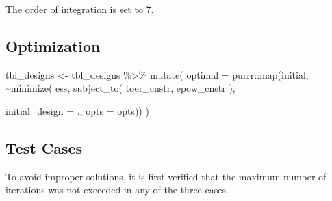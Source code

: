 \documentclass[
]{book}
\newenvironment{Shaded}{\begin{snugshade}}{\end{snugshade}}
\newcommand{\AttributeTok}[1]{\textcolor[rgb]{0.77,0.63,0.00}{#1}}
\newcommand{\FunctionTok}[1]{\textcolor[rgb]{0.00,0.00,0.00}{#1}}
\newcommand{\NormalTok}[1]{#1}
\newcommand{\OtherTok}[1]{\textcolor[rgb]{0.56,0.35,0.01}{#1}}
\newcommand{\SpecialCharTok}[1]{\textcolor[rgb]{0.00,0.00,0.00}{#1}}
\begin{document}
The order of integration is set to 7.

\hypertarget{optimization-16}{%
\subsection{Optimization}\label{optimization-16}}

\begin{Shaded}
\begin{Highlighting}[]
\NormalTok{tbl\_designs }\OtherTok{\textless{}{-}}\NormalTok{ tbl\_designs }\SpecialCharTok{\%\textgreater{}\%} 
    \FunctionTok{mutate}\NormalTok{(}
       \AttributeTok{optimal =}\NormalTok{ purrr}\SpecialCharTok{::}\FunctionTok{map}\NormalTok{(initial, }\SpecialCharTok{\textasciitilde{}}\FunctionTok{minimize}\NormalTok{(}
\NormalTok{          ess,}
          \FunctionTok{subject\_to}\NormalTok{(}
\NormalTok{              toer\_cnstr,}
\NormalTok{              epow\_cnstr}
\NormalTok{          ),}
          
          \AttributeTok{initial\_design =}\NormalTok{ ., }
          \AttributeTok{opts           =}\NormalTok{ opts)) )}
\end{Highlighting}
\end{Shaded}

\hypertarget{test-cases-17}{%
\subsection{Test Cases}\label{test-cases-17}}

To avoid improper solutions, it is first verified that the maximum number of iterations was not exceeded in any of the three cases.

\begin{Shaded}
\end{Shaded}
\end{document}
